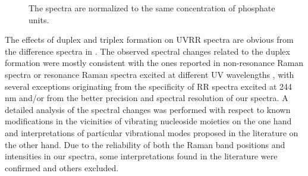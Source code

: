 \begin{figure}
	\centering
	
	\caption[%
		Resonance Raman spectra (244\,nm excitation) of polyA, polyU and
		their 1:1 and 1:2 mixtures in aqueous solution.
	]{%
		The spectra are normalized to the same concentration of phosphate units.
	}
	\label{\figlabel{rna_triplex:spectra}}
\end{figure}


The effects of duplex and triplex formation on UVRR spectra are obvious from
the difference spectra in
.
The observed spectral changes related to the duplex formation were mostly
consistent with the ones reported in non-resonance Raman spectra
\parencite{%
	OConnor1984,%
	Hanus1999%
}
or resonance Raman spectra excited at different UV wavelengths
\parencite{%
	Gfrorer1993a,%
	Perno1989,%
	Grygon1990%
},
with several exceptions originating from the specificity of RR spectra excited
at 244\,nm and/or from the better precision and spectral resolution of our
spectra.
A detailed analysis of the spectral changes was performed with respect to known
modifications in the vicinities of vibrating nucleoside moieties on the one
hand and interpretations of particular vibrational modes proposed in the
literature on the other hand.
Due to the reliability of both the Raman band positions and intensities in our
spectra, some interpretations found in the literature were confirmed and others
excluded.

\begin{figure}
	\centering
	
	\caption[%
		Difference resonance Raman spectra (244-nm excitation) calculated from
		those in
		that reflect spectral effects of duplex formation from two single
		strands and triplex formation from the duplex and single-strand polyU.
	]{%
	}
	\label{\figlabel{rna_triplex:difference}}
\end{figure}

